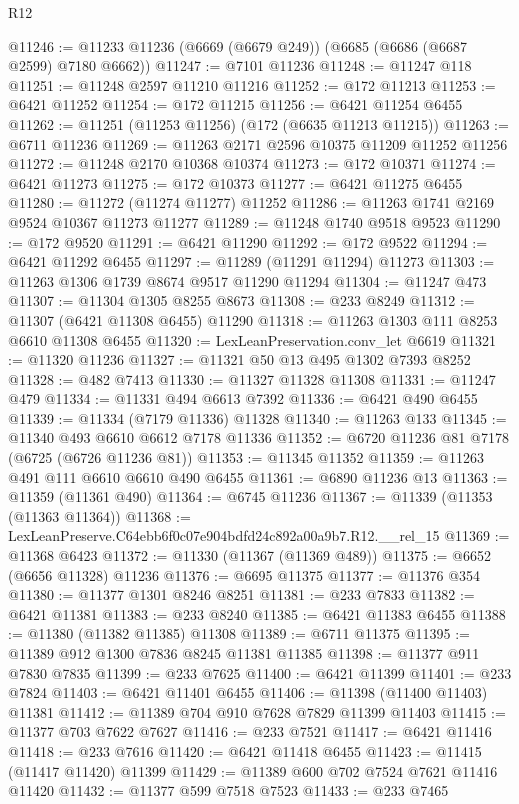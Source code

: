 \begin{lexlean}{R12}
\begin{coremodule}
@11246 := @11233 @11236 (@6669 (@6679 @249)) (@6685 (@6686 (@6687 @2599) @7180 @6662))
@11247 := @7101 @11236
@11248 := @11247 @118
@11251 := @11248 @2597 @11210 @11216
@11252 := @172 @11213
@11253 := @6421 @11252
@11254 := @172 @11215
@11256 := @6421 @11254 @6455
@11262 := @11251 (@11253 @11256) (@172 (@6635 @11213 @11215))
@11263 := @6711 @11236
@11269 := @11263 @2171 @2596 @10375 @11209 @11252 @11256
@11272 := @11248 @2170 @10368 @10374
@11273 := @172 @10371
@11274 := @6421 @11273
@11275 := @172 @10373
@11277 := @6421 @11275 @6455
@11280 := @11272 (@11274 @11277) @11252
@11286 := @11263 @1741 @2169 @9524 @10367 @11273 @11277
@11289 := @11248 @1740 @9518 @9523
@11290 := @172 @9520
@11291 := @6421 @11290
@11292 := @172 @9522
@11294 := @6421 @11292 @6455
@11297 := @11289 (@11291 @11294) @11273
@11303 := @11263 @1306 @1739 @8674 @9517 @11290 @11294
@11304 := @11247 @473
@11307 := @11304 @1305 @8255 @8673
@11308 := @233 @8249
@11312 := @11307 (@6421 @11308 @6455) @11290
@11318 := @11263 @1303 @111 @8253 @6610 @11308 @6455
@11320 := LexLeanPreservation.conv_let @6619
@11321 := @11320 @11236
@11327 := @11321 @50 @13 @495 @1302 @7393 @8252
@11328 := @482 @7413
@11330 := @11327 @11328 @11308
@11331 := @11247 @479
@11334 := @11331 @494 @6613 @7392
@11336 := @6421 @490 @6455
@11339 := @11334 (@7179 @11336) @11328
@11340 := @11263 @133
@11345 := @11340 @493 @6610 @6612 @7178 @11336
@11352 := @6720 @11236 @81 @7178 (@6725 (@6726 @11236 @81))
@11353 := @11345 @11352
@11359 := @11263 @491 @111 @6610 @6610 @490 @6455
@11361 := @6890 @11236 @13
@11363 := @11359 (@11361 @490)
@11364 := @6745 @11236
@11367 := @11339 (@11353 (@11363 @11364))
@11368 := LexLeanPreserve.C64ebb6f0c07e904bdfd24c892a00a9b7.R12.__rel_15
@11369 := @11368 @6423
@11372 := @11330 (@11367 (@11369 @489))
@11375 := @6652 (@6656 @11328) @11236
@11376 := @6695 @11375
@11377 := @11376 @354
@11380 := @11377 @1301 @8246 @8251
@11381 := @233 @7833
@11382 := @6421 @11381
@11383 := @233 @8240
@11385 := @6421 @11383 @6455
@11388 := @11380 (@11382 @11385) @11308
@11389 := @6711 @11375
@11395 := @11389 @912 @1300 @7836 @8245 @11381 @11385
@11398 := @11377 @911 @7830 @7835
@11399 := @233 @7625
@11400 := @6421 @11399
@11401 := @233 @7824
@11403 := @6421 @11401 @6455
@11406 := @11398 (@11400 @11403) @11381
@11412 := @11389 @704 @910 @7628 @7829 @11399 @11403
@11415 := @11377 @703 @7622 @7627
@11416 := @233 @7521
@11417 := @6421 @11416
@11418 := @233 @7616
@11420 := @6421 @11418 @6455
@11423 := @11415 (@11417 @11420) @11399
@11429 := @11389 @600 @702 @7524 @7621 @11416 @11420
@11432 := @11377 @599 @7518 @7523
@11433 := @233 @7465

\end{coremodule}
\end{lexlean}
